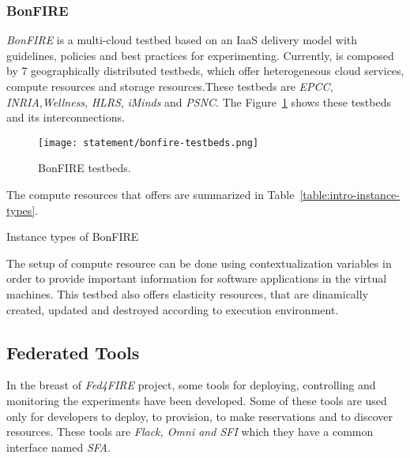 \subsubsection{BonFIRE}

\emph{BonFIRE} is a multi-cloud testbed based on an \ac{IaaS}
delivery model with guidelines, policies and best practices for
experimenting. Currently, \bonfire is composed by 7 geographically distributed
testbeds, which offer heterogeneous cloud services, compute resources and
storage resources.These testbeds are \emph{EPCC},\emph{ INRIA},\emph{Wellness},\emph{ HLRS}, \emph{iMinds} and \emph{PSNC}. The Figure~\ref{fig:intr-bonfire-testbeds} shows these testbeds and its interconnections.

\begin{figure}[!h]
\begin{center}
\texttt{[image: statement/bonfire-testbeds.png]}
\caption{BonFIRE testbeds.}
\label{fig:intr-bonfire-testbeds}
\end{center}
\end{figure}

The compute resources that \bonfire offers are summarized in Table~\ref{table:intro-instance-types}.

\begin{table}[hp]
  \centering
  {\small
  
  }
  \caption{Instance types of BonFIRE}
  \label{table:intro-instance-types}
\end{table}


The setup of compute resource can be done using contextualization variables in
order to provide important information for software applications in the virtual
machines. 
This testbed also offers elasticity resources, that are dinamically created,
updated and destroyed according to execution environment.


\subsection{Federated Tools}
\label{subsec:federatedtools}
In the breast of \emph{Fed4FIRE} project, some tools for deploying, controlling and
monitoring the experiments have been developed. 
Some of these tools are used only for developers to deploy, to provision, to
make reservations and to discover resources. These tools are \emph{Flack, Omni
  and SFI} which they have a common interface named \emph{SFA}.

